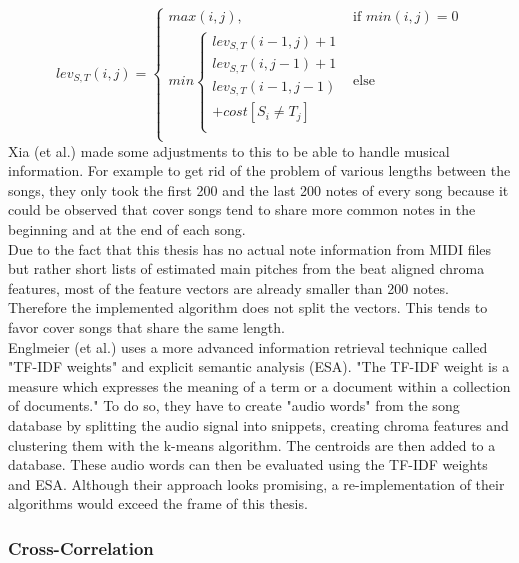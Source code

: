 \begin{equation} \label{eq:tr1}
lev_{S,T}(i, j) = \begin{cases}
max(i, j), &\text{if } min(i, j) = 0\\
min \begin{cases}
lev_{S,T}(i-1, j) + 1\\
lev_{S,T}(i, j-1) + 1\\
lev_{S,T}(i-1, j-1)\\
+cost[S_i \neq T_j]\\
\end{cases} &\text{else} \\
\end{cases}
\end{equation}
Xia (et al.) made some adjustments to this to be able to handle musical information.\cite[pp. 7ff]{chroma4} For example to get rid of the problem of various lengths between the songs, they only took the first 200 and the last 200 notes of every song because it could be observed that cover songs tend to share more common notes in the beginning and at the end of each song.\\
Due to the fact that this thesis has no actual note information from MIDI files but rather short lists of estimated main pitches from the beat aligned chroma features, most of the feature vectors are already smaller than 200 notes. Therefore the implemented algorithm does not split the vectors. This tends to favor cover songs that share the same length. 
\ \\
Englmeier  (et al.) uses a more advanced information retrieval technique called "TF-IDF weights" and explicit semantic analysis (ESA). "The TF-IDF weight is a measure which expresses the meaning of a term or a document within a collection of documents." \cite[p. 186]{chroma1}
To do so, they have to create "audio words" from the song database by splitting the audio signal into snippets, creating chroma features and clustering them with the k-means algorithm. The centroids are then added to a database. These audio words can then be evaluated using the TF-IDF weights and ESA.
Although their approach looks promising, a re-implementation of their algorithms would exceed the frame of this thesis.

\subsubsection{Cross-Correlation}\label{crosscorrsec}

